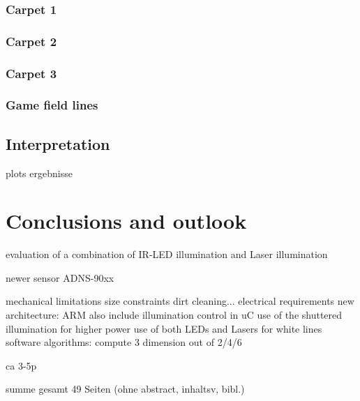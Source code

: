 \documentclass[12pt,a4paper]{article}
\begin{document}
\subsubsection{Carpet 1}

\subsubsection{Carpet 2}

\subsubsection{Carpet 3}

\subsubsection{Game field lines}

\subsection{Interpretation}

  plots
  ergebnisse

\section{Conclusions and outlook}

  evaluation of a combination of IR-LED illumination and Laser illumination

  newer sensor ADNS-90xx

  mechanical limitations
    size constraints
    dirt cleaning...
  electrical requirements
    new architecture: ARM
    also include illumination control in uC
      use of the shuttered illumination for higher power 
      use of both LEDs and Lasers for white lines
  software algorithms: compute 3 dimension out of 2/4/6

ca 3-5p


summe gesamt 49 Seiten (ohne abstract, inhaltsv, bibl.)


\label{Bibliography}


%
\end{document}
